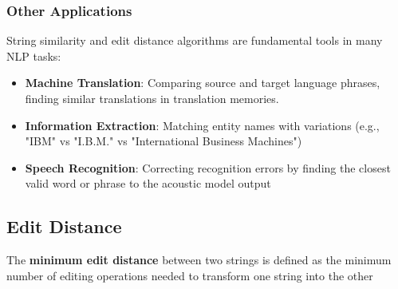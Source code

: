 \documentclass[a4paper]{article}
\theoremstyle{definition}
\begin{document}
\subsubsection{Other Applications}
String similarity and edit distance algorithms are fundamental tools in many NLP tasks:
\begin{itemize}
  \item \textbf{Machine Translation}: Comparing source and target language phrases, finding similar translations in translation memories.
  \item \textbf{Information Extraction}: Matching entity names with variations (e.g., "IBM" vs "I.B.M." vs "International Business Machines")
  \item \textbf{Speech Recognition}: Correcting recognition errors by finding the closest valid word or phrase to the acoustic model output
\end{itemize}
\subsection{Edit Distance}
The \textbf{minimum edit distance} between two strings is defined as the minimum number of editing operations needed to transform 
one string into the other
\end{document}
